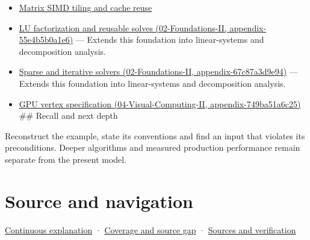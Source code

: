 \begin{itemize}
\item
  \hyperref[appendix-1bfb7c657105]{Matrix SIMD tiling and cache reuse}
\item
  \href{../02-Foundations-II/main.pdf\#nameddest=appendix-55e4b5b0a1e6}{LU factorization and reusable solves (02-Foundations-II, appendix-55e4b5b0a1e6)} --- Extends this foundation into linear-systems and decomposition analysis.
\item
  \href{../02-Foundations-II/main.pdf\#nameddest=appendix-67c87a3d9e94}{Sparse and iterative solvers (02-Foundations-II, appendix-67c87a3d9e94)} --- Extends this foundation into linear-systems and decomposition analysis.
\item
  \href{../04-Visual-Computing-II/main.pdf\#nameddest=appendix-749ba51a6c25}{GPU vertex specification (04-Visual-Computing-II, appendix-749ba51a6c25)} \#\# Recall and next depth
\end{itemize}

Reconstruct the example, state its conventions and find an input that violates its preconditions. Deeper algorithms and measured production performance remain separate from the present model.

\section{Source and navigation}\label{appendix-ffdc1d4e5350-source-and-navigation}

\href{Continuous\%20Notes/Computing\%20Foundations\%20-\%20From\%20Bits\%20to\%20C++\%20and\%20Systems\%20APIs\#Keep\%20the\%20promises\%20visible\%20while\%20moving\%20between\%20representations}{Continuous explanation} · \hyperref[appendix-fd090d982a15-phase-7---parts-601-700]{Coverage and source gap} · \hyperref[appendix-a103e7846d21-phase-7---source-analysis-and-verification]{Sources and verification}
